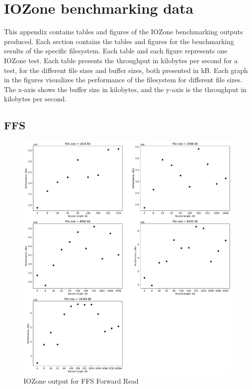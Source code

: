 \chapter{IOZone benchmarking data}
\label{app:bench_data}
This appendix contains tables and figures of the IOZone benchmarking outputs produced. Each section contains the tables and figures for the benchmarking results of the specific filesystem. Each table and each figure represents one IOZone test. Each table presents the throughput in kilobytes per second for a test, for the different file sizes and buffer sizes, both presented in kB. Each graph in the figures visualizes the performance of the filesystem for different file sizes. The x-axis shows the buffer size in kilobytes, and the y-axis is the throughput in kilobytes per second.

\section{FFS}








\begin{figure}[!htb]
	\label{fig:app_bench_ffs_read}
	\begin{center}
		\includegraphics[width=1.0\textwidth]{figures/benchmarking/ffs/Read.pdf}
	\end{center}
	\caption{IOZone output for FFS Forward Read}
\end{figure}

